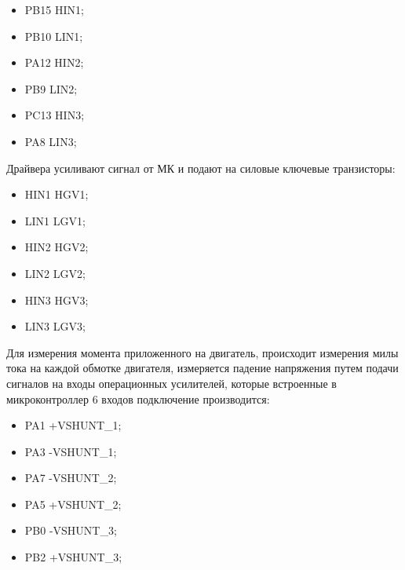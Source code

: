\begin{itemize}
	\item PB15 \rightarrow HIN1;
	\item PB10 \rightarrow LIN1;
	\item PA12 \rightarrow HIN2;
	\item PB9 \rightarrow LIN2;
	\item PC13 \rightarrow HIN3;
	\item PA8 \rightarrow LIN3;
\end{itemize}
Драйвера усиливают сигнал от МК и подают на силовые ключевые транзисторы:
\begin{itemize}
	\item HIN1 \rightarrow HGV1;
	\item LIN1 \rightarrow LGV1;
	\item HIN2 \rightarrow HGV2;
	\item LIN2 \rightarrow LGV2;
	\item HIN3 \rightarrow HGV3;
	\item LIN3 \rightarrow LGV3;
\end{itemize}



Для измерения момента приложенного на двигатель, происходит измерения милы тока на каждой обмотке двигателя, измеряется падение напряжения путем подачи сигналов на входы операционных усилителей, которые встроенные в микроконтроллер 6 входов подключение производится:

\begin{itemize}
	\item PA1 \leftarrow +VSHUNT\_1;
	\item PA3 \leftarrow -VSHUNT\_1;
	\item PA7 \leftarrow -VSHUNT\_2;
	\item PA5 \leftarrow +VSHUNT\_2;  %
	\item PB0 \leftarrow -VSHUNT\_3;
	\item PB2 \leftarrow +VSHUNT\_3;  %
\end{itemize}

